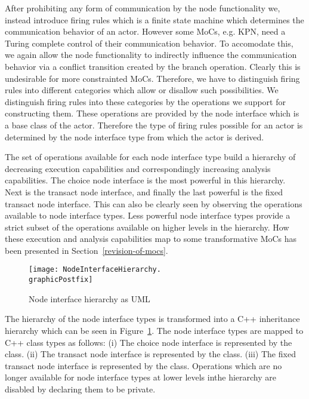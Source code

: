 After prohibiting any form of communication by the node functionality we,
instead introduce firing rules which is a finite state machine which determines
the communication behavior of an actor. However some MoCs, e.g. KPN, need
a Turing complete control of their communication behavior. To
accomodate this, we again allow the node functionality to indirectly
influence the communication behavior via a conflict transition
created by the branch operation. Clearly this is undesirable for more
constrainted MoCs. Therefore, we have to distinguish firing rules into
different categories which allow or disallow such possibilities. We
distinguish firing rules into these categories by the operations we
support for constructing them. These operations are provided by the
node interface which is a base class of the actor. Therefore the
type of firing rules possible for an actor is determined by the
node interface type from which the actor is derived.


The set of operations available for each node interface type
build a hierarchy of decreasing execution capabilities and
correspondingly increasing analysis capabilities.
The choice node interface is the most powerful in this hierarchy.
Next is the transact node interface, and finally the last powerful is the
fixed transact node interface. This can also be clearly seen
by observing the operations available to node interface types.
Less powerful node interface types provide a strict subset of
the operations available on higher levels in the hierarchy.
How these execution and analysis capabilities map to some transformative
MoCs has been presented in Section~\ref{revision-of-mocs}.

\begin{figure}[h]
\centering
\texttt{[image: NodeInterfaceHierarchy.\\graphicPostfix]}\\
\caption{\label{node-interface-hierarchy}Node interface hierarchy as UML}
\end{figure}

The hierarchy of the node interface types is transformed into
a C++ inheritance hierarchy which can be seen in Figure~\ref{node-interface-hierarchy}.
The node interface types are mapped to C++ class types as follows:
(i) The choice node interface is represented by the  class.
(ii) The transact node interface is represented by the  class.
(iii) The fixed transact node interface is represented by the  class.
Operations which are no longer available for node interface types
at lower levels inthe hierarchy are disabled by declaring them to be private.

